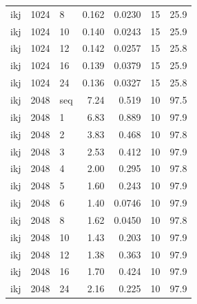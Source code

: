 \begin{table}[!ht]
\begin{tabular}{@{}lrlrrrr@{}}
ikj & 1024 & 8 & 0.162 & 0.0230 & 15 & 25.9 \\
ikj & 1024 & 10 & 0.140 & 0.0243 & 15 & 25.9 \\
ikj & 1024 & 12 & 0.142 & 0.0257 & 15 & 25.8 \\
ikj & 1024 & 16 & 0.139 & 0.0379 & 15 & 25.9 \\
ikj & 1024 & 24 & 0.136 & 0.0327 & 15 & 25.8 \\
ikj & 2048 & seq & 7.24 & 0.519 & 10 & 97.5 \\
ikj & 2048 & 1 & 6.83 & 0.889 & 10 & 97.9 \\
ikj & 2048 & 2 & 3.83 & 0.468 & 10 & 97.8 \\
ikj & 2048 & 3 & 2.53 & 0.412 & 10 & 97.9 \\
ikj & 2048 & 4 & 2.00 & 0.295 & 10 & 97.8 \\
ikj & 2048 & 5 & 1.60 & 0.243 & 10 & 97.9 \\
ikj & 2048 & 6 & 1.40 & 0.0746 & 10 & 97.9 \\
ikj & 2048 & 8 & 1.62 & 0.0450 & 10 & 97.8 \\
ikj & 2048 & 10 & 1.43 & 0.203 & 10 & 97.9 \\
ikj & 2048 & 12 & 1.38 & 0.363 & 10 & 97.9 \\
ikj & 2048 & 16 & 1.70 & 0.424 & 10 & 97.9 \\
ikj & 2048 & 24 & 2.16 & 0.225 & 10 & 97.9 \\
\bottomrule
\end{tabular}
\end{table}
